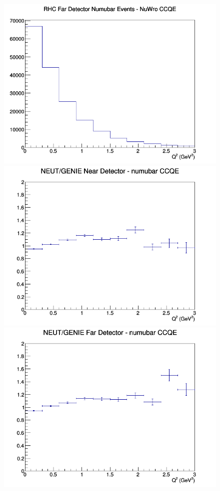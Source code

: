 \begin{figure}[h]
\endminipage
{}
\includegraphics[width=\linewidth]{Q2/nominal/CCQE_RHC_FD_numubar_Q2_NuWro.png}
\endminipage
\newline
{}
\includegraphics[width=\linewidth]{Q2/nominal/ratios/CCQE_NEUT_GENIE_numubar_near_Q2.png}
\endminipage
{}
\includegraphics[width=\linewidth]{Q2/nominal/ratios/CCQE_NEUT_GENIE_numubar_far_Q2.png}

\end{figure}
